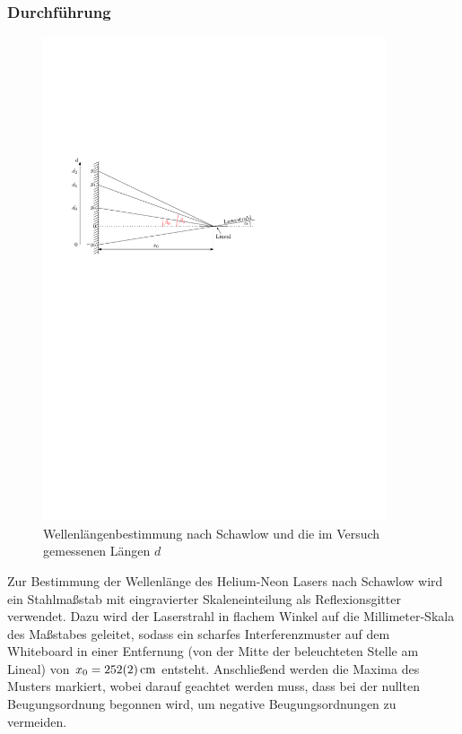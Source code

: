 \documentclass[11pt, a4paper]{article}
\numberwithin{equation}{section}
\begin{document}
\subsubsection{Durchführung}
\begin{figure}[h]
	\centering
	\includegraphics[width=0.9\textwidth]{./figures/wellenlaenge_lineal.pdf}
	\caption{Wellenlängenbestimmung nach Schawlow \cite{schawlow} und die im Versuch gemessenen Längen $d$}
	\label{fig:schawlow}
\end{figure}
Zur Bestimmung der Wellenlänge des Helium-Neon Lasers nach Schawlow \cite{schawlow} wird ein Stahlmaßstab mit eingravierter Skaleneinteilung als Reflexionsgitter verwendet.
Dazu wird der Laserstrahl in flachem Winkel auf die Millimeter-Skala des Maßstabes geleitet, sodass ein scharfes Interferenzmuster auf dem Whiteboard in einer Entfernung (von der Mitte der beleuchteten Stelle am Lineal) von $x_0 = \SI{252 +- 2}{\centi\metre}$ entsteht.
Anschließend werden die Maxima des Musters markiert, wobei darauf geachtet werden muss, dass bei der nullten Beugungsordnung begonnen wird, um negative Beugungsordnungen zu vermeiden.
\end{document}
